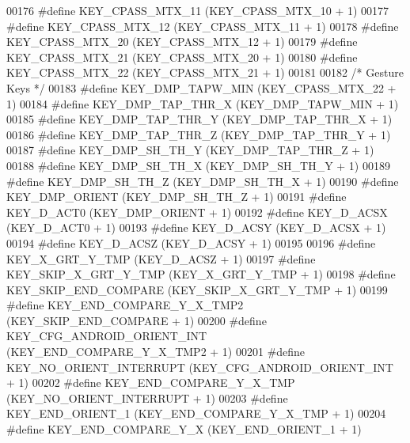 \begin{DoxyCode}
00176 \textcolor{preprocessor}{#define KEY\_CPASS\_MTX\_11            (KEY\_CPASS\_MTX\_10 + 1)}
00177 \textcolor{preprocessor}{#define KEY\_CPASS\_MTX\_12            (KEY\_CPASS\_MTX\_11 + 1)}
00178 \textcolor{preprocessor}{#define KEY\_CPASS\_MTX\_20            (KEY\_CPASS\_MTX\_12 + 1)}
00179 \textcolor{preprocessor}{#define KEY\_CPASS\_MTX\_21            (KEY\_CPASS\_MTX\_20 + 1)}
00180 \textcolor{preprocessor}{#define KEY\_CPASS\_MTX\_22            (KEY\_CPASS\_MTX\_21 + 1)}
00181 
00182 \textcolor{comment}{/* Gesture Keys */}
00183 \textcolor{preprocessor}{#define KEY\_DMP\_TAPW\_MIN            (KEY\_CPASS\_MTX\_22 + 1)}
00184 \textcolor{preprocessor}{#define KEY\_DMP\_TAP\_THR\_X           (KEY\_DMP\_TAPW\_MIN + 1)}
00185 \textcolor{preprocessor}{#define KEY\_DMP\_TAP\_THR\_Y           (KEY\_DMP\_TAP\_THR\_X + 1)}
00186 \textcolor{preprocessor}{#define KEY\_DMP\_TAP\_THR\_Z           (KEY\_DMP\_TAP\_THR\_Y + 1)}
00187 \textcolor{preprocessor}{#define KEY\_DMP\_SH\_TH\_Y             (KEY\_DMP\_TAP\_THR\_Z + 1)}
00188 \textcolor{preprocessor}{#define KEY\_DMP\_SH\_TH\_X             (KEY\_DMP\_SH\_TH\_Y + 1)}
00189 \textcolor{preprocessor}{#define KEY\_DMP\_SH\_TH\_Z             (KEY\_DMP\_SH\_TH\_X + 1)}
00190 \textcolor{preprocessor}{#define KEY\_DMP\_ORIENT              (KEY\_DMP\_SH\_TH\_Z + 1)}
00191 \textcolor{preprocessor}{#define KEY\_D\_ACT0                  (KEY\_DMP\_ORIENT + 1)}
00192 \textcolor{preprocessor}{#define KEY\_D\_ACSX                  (KEY\_D\_ACT0 + 1)}
00193 \textcolor{preprocessor}{#define KEY\_D\_ACSY                  (KEY\_D\_ACSX + 1)}
00194 \textcolor{preprocessor}{#define KEY\_D\_ACSZ                  (KEY\_D\_ACSY + 1)}
00195 
00196 \textcolor{preprocessor}{#define KEY\_X\_GRT\_Y\_TMP             (KEY\_D\_ACSZ + 1)}
00197 \textcolor{preprocessor}{#define KEY\_SKIP\_X\_GRT\_Y\_TMP        (KEY\_X\_GRT\_Y\_TMP + 1)}
00198 \textcolor{preprocessor}{#define KEY\_SKIP\_END\_COMPARE        (KEY\_SKIP\_X\_GRT\_Y\_TMP + 1)}
00199 \textcolor{preprocessor}{#define KEY\_END\_COMPARE\_Y\_X\_TMP2    (KEY\_SKIP\_END\_COMPARE + 1)       }
00200 \textcolor{preprocessor}{#define KEY\_CFG\_ANDROID\_ORIENT\_INT  (KEY\_END\_COMPARE\_Y\_X\_TMP2 + 1)}
00201 \textcolor{preprocessor}{#define KEY\_NO\_ORIENT\_INTERRUPT     (KEY\_CFG\_ANDROID\_ORIENT\_INT + 1)}
00202 \textcolor{preprocessor}{#define KEY\_END\_COMPARE\_Y\_X\_TMP     (KEY\_NO\_ORIENT\_INTERRUPT + 1)}
00203 \textcolor{preprocessor}{#define KEY\_END\_ORIENT\_1            (KEY\_END\_COMPARE\_Y\_X\_TMP + 1)}
00204 \textcolor{preprocessor}{#define KEY\_END\_COMPARE\_Y\_X         (KEY\_END\_ORIENT\_1 + 1) }

\end{DoxyCode}
